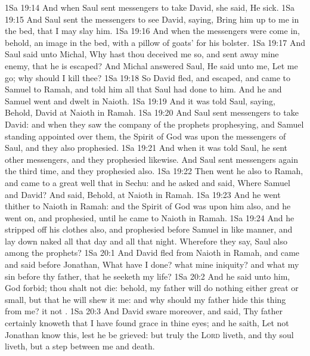 \vs 1Sa 19:14 And when Saul sent messengers to take David, she said, He  sick.
\vs 1Sa 19:15 And Saul sent the messengers  to see David, saying, Bring him up to me in the bed, that I may slay him.
\vs 1Sa 19:16 And when the messengers were come in, behold,  an image in the bed, with a pillow of goats'  for his bolster.
\vs 1Sa 19:17 And Saul said unto Michal, Why hast thou deceived me so, and sent away mine enemy, that he is escaped? And Michal answered Saul, He said unto me, Let me go; why should I kill thee?
\vs 1Sa 19:18 So David fled, and escaped, and came to Samuel to Ramah, and told him all that Saul had done to him. And he and Samuel went and dwelt in Naioth.
\vs 1Sa 19:19 And it was told Saul, saying, Behold, David  at Naioth in Ramah.
\vs 1Sa 19:20 And Saul sent messengers to take David: and when they saw the company of the prophets prophesying, and Samuel standing  appointed over them, the Spirit of God was upon the messengers of Saul, and they also prophesied.
\vs 1Sa 19:21 And when it was told Saul, he sent other messengers, and they prophesied likewise. And Saul sent messengers again the third time, and they prophesied also.
\vs 1Sa 19:22 Then went he also to Ramah, and came to a great well that  in Sechu: and he asked and said, Where  Samuel and David? And  said, Behold,  at Naioth in Ramah.
\vs 1Sa 19:23 And he went thither to Naioth in Ramah: and the Spirit of God was upon him also, and he went on, and prophesied, until he came to Naioth in Ramah.
\vs 1Sa 19:24 And he stripped off his clothes also, and prophesied before Samuel in like manner, and lay down naked all that day and all that night. Wherefore they say,  Saul also among the prophets?
\vs 1Sa 20:1 And David fled from Naioth in Ramah, and came and said before Jonathan, What have I done? what  mine iniquity? and what  my sin before thy father, that he seeketh my life?
\vs 1Sa 20:2 And he said unto him, God forbid; thou shalt not die: behold, my father will do nothing either great or small, but that he will shew it me: and why should my father hide this thing from me? it  not .
\vs 1Sa 20:3 And David sware moreover, and said, Thy father certainly knoweth that I have found grace in thine eyes; and he saith, Let not Jonathan know this, lest he be grieved: but truly  the \textsc{Lord} liveth, and  thy soul liveth,  but a step between me and death.

